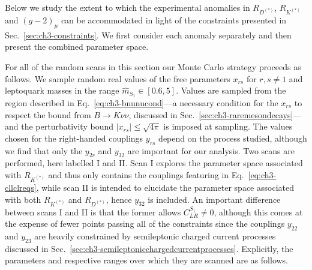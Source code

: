 Below we study the extent to which the experimental anomalies in $R_{D^{(*)}}$,
$R_{K^{(*)}}$ and $(g-2)_\mu$ can be accommodated in light of the constraints presented
in Sec.~\ref{sec:ch3-constraints}. We first consider each anomaly separately and
then present the combined parameter space.

For all of the random scans in this section our Monte Carlo strategy proceeds as
follows. We sample random real values of the free parameters $x_{rs}$ for $r,s
\neq 1$ and leptoquark masses in the range $\hat{m}_{S_{1}} \in [0.6, 5]$. Values
are sampled from the region described in Eq.~\eqref{eq:ch3-bnunucond}---a necessary
condition for the $x_{rs}$ to respect the bound from $B \to K\nu\nu$, discussed
in Sec.~\ref{sec:ch3-raremesondecays}---and the perturbativity bound $|x_{rs}| \leq
\sqrt{4\pi}$ is imposed at sampling. The values chosen for the right-handed
couplings $y_{rs}$ depend on the process studied, although we find that only the
$y_{2r}$ and $y_{32}$ are important for our analysis. Two scans are performed,
here labelled I and II. Scan I explores the parameter space associated with
$R_{K^{(*)}}$ and thus only contains the couplings featuring in
Eq.~\eqref{eq:ch3-cllclreqs}, while scan II is intended to elucidate the parameter
space associated with both $R_{K^{(*)}}$ and $R_{D^{(*)}}$, hence $y_{32}$ is
included. An important difference between scans I and II is that the former
allows $C_{LR}^{S_{1}} \neq 0$, although this comes at the expense of fewer points
passing all of the constraints since the couplings $y_{22}$ and $y_{23}$ are
heavily constrained by semileptonic charged current processes discussed in
Sec.~\ref{sec:ch3-semileptonicchargedcurrentprocesses}. Explicitly, the parameters
and respective ranges over which they are scanned are as follows.
